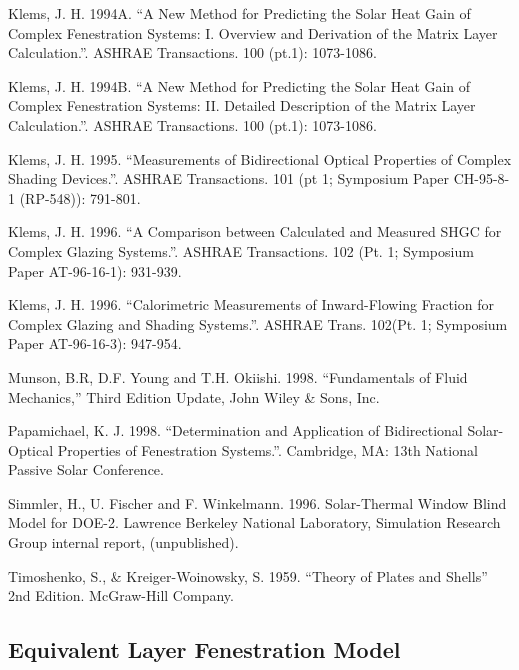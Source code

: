 Klems, J. H. 1994A. ``A New Method for Predicting the Solar Heat Gain of Complex Fenestration Systems: I. Overview and Derivation of the Matrix Layer Calculation.''. ASHRAE Transactions. 100 (pt.1): 1073-1086.

Klems, J. H. 1994B. ``A New Method for Predicting the Solar Heat Gain of Complex Fenestration Systems: II. Detailed Description of the Matrix Layer Calculation.''. ASHRAE Transactions. 100 (pt.1): 1073-1086.

Klems, J. H. 1995. ``Measurements of Bidirectional Optical Properties of Complex Shading Devices.''. ASHRAE Transactions. 101 (pt 1; Symposium Paper CH-95-8-1 (RP-548)): 791-801.

Klems, J. H. 1996. ``A Comparison between Calculated and Measured SHGC for Complex Glazing Systems.''. ASHRAE Transactions. 102 (Pt. 1; Symposium Paper AT-96-16-1): 931-939.

Klems, J. H. 1996. ``Calorimetric Measurements of Inward-Flowing Fraction for Complex Glazing and Shading Systems.''. ASHRAE Trans. 102(Pt. 1; Symposium Paper AT-96-16-3): 947-954.

Munson, B.R, D.F. Young and T.H. Okiishi. 1998. ``Fundamentals of Fluid Mechanics,'' Third Edition Update, John Wiley \& Sons, Inc.

Papamichael, K. J. 1998. ``Determination and Application of Bidirectional Solar-Optical Properties of Fenestration Systems.''. Cambridge, MA: 13th National Passive Solar Conference.

Simmler, H., U. Fischer and F. Winkelmann. 1996. Solar-Thermal Window Blind Model for DOE-2. Lawrence Berkeley National Laboratory, Simulation Research Group internal report, (unpublished).

Timoshenko, S., \& Kreiger-Woinowsky, S. 1959. ``Theory of Plates and Shells'' 2nd Edition. McGraw-Hill Company.

\subsection{Equivalent Layer Fenestration Model}\label{equivalent-layer-fenestration-model}

